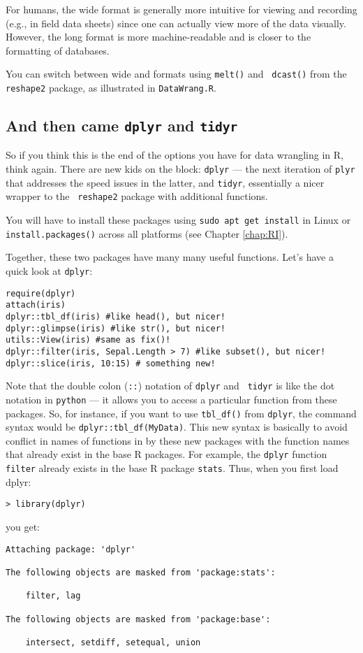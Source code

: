 \begin{tipbox}
For humans, the wide format is generally more intuitive for viewing and 
recording (e.g., in field data sheets) since one can actually view more 
of the data visually. However, the long format is more machine-readable 
and is closer to the formatting of databases. 
\end{tipbox}

You can switch between wide and formats using {\tt melt()} and {\tt 
dcast()} from the {\tt reshape2} package, as illustrated in {\tt DataWrang.R}. 

\subsection{And then came {\tt dplyr} and {\tt tidyr}}

So if you think this is the end of the options you have for data 
wrangling in R, think again. There are new kids on the block: {\tt dplyr} 
--- the next iteration of {\tt plyr} that addresses the speed issues in 
the latter, and {\tt tidyr}, essentially a nicer wrapper to the {\tt 
reshape2} package with additional functions. 
  
You will have to install these packages using {\tt sudo apt get 
install} in Linux or {\tt install.packages()} across all platforms (see 
Chapter \ref{chap:RI}). 

Together, these two packages have many many useful functions. Let's 
have a quick look at {\tt dplyr}:

\begin{lstlisting}
require(dplyr)
attach(iris)
dplyr::tbl_df(iris)	#like head(), but nicer!
dplyr::glimpse(iris) #like str(), but nicer!
utils::View(iris) #same as fix()!
dplyr::filter(iris, Sepal.Length > 7) #like subset(), but nicer!
dplyr::slice(iris, 10:15) # something new!
\end{lstlisting}

Note that the double colon ({\tt ::}) notation of {\tt dplyr} and {\tt 
tidyr} is like the dot notation in {\tt python} --- it allows you to 
access a particular function from these packages. So, for instance, if 
you want to use {\tt tbl\_df()} from {\tt dplyr}, the command syntax 
would be {\tt dplyr::tbl\_df(MyData)}. This new syntax is basically to 
avoid conflict in names of functions in by these new packages with the 
function names that already exist in the base R packages. For example, 
the {\tt dplyr} function {\tt filter} already exists in the base R 
package {\tt stats}. Thus, when you first load {dplyr}:  
\begin{lstlisting}	
> library(dplyr)
\end{lstlisting}	
you get:
\begin{lstlisting}	
Attaching package: 'dplyr'

The following objects are masked from 'package:stats':

    filter, lag

The following objects are masked from 'package:base':

    intersect, setdiff, setequal, union
\end{lstlisting}

